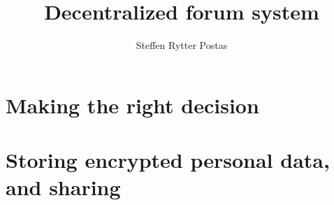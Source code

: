\documentclass[11pt]{article}
\title{\textbf{Decentralized forum system}}
\author{Steffen Rytter Postas}
\date{}
\begin{document}
\maketitle

\section{Making the right decision}

\section{Storing encrypted personal data, and sharing}
\end{document}
